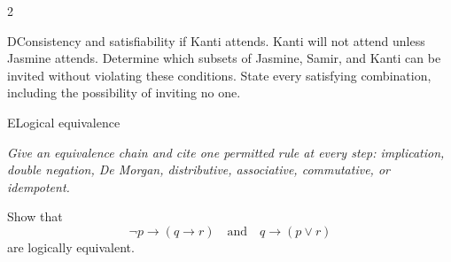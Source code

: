 \documentclass[9pt]{extarticle}
\begin{document}
\begin{multicols}{2}
\begin{CoreProblem}{D}{Consistency and satisfiability}
if Kanti attends. Kanti will not attend unless Jasmine attends. Determine which
subsets of Jasmine, Samir, and Kanti can be invited without violating these
conditions. State every satisfying combination, including the possibility of
inviting no one.
\end{CoreProblem}
\begin{CoreProblem}{E}{Logical equivalence}
{\scriptsize\textit{Give an equivalence chain and cite one permitted rule at every step: implication, double negation, De Morgan, distributive, associative, commutative, or idempotent.}\par}
Show that
\[
  \neg p\to(q\to r)
  \quad\text{and}\quad
  q\to(p\lor r)
\]
are logically equivalent.
\end{CoreProblem}
\end{multicols}
\CoreWorkArea
\FormBreak
{}
\end{document}
